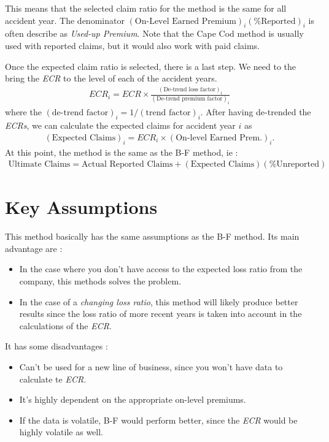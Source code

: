 \documentclass[11pt, english]{memoir}
\numberwithin{definition}{section}
\begin{document}
This means that the selected claim ratio for the method is the same for all accident year. The denominator $  (\text{On-Level Earned Premium})_{i} (\text{\% Reported})_{i} $ is often describe as \emph{Used-up Premium}. Note that the Cape Cod method is usually used with reported claims, but it would also work with paid claims. 

Once the expected claim ratio is selected, there is a last step. We need to the bring the \emph{ECR} to the level of each of the accident years. 
\begin{align*}
ECR_{i} = ECR \times \frac{(\text{De-trend loss factor})_{i}}{(\text{De-trend premium factor})_{i}}
\end{align*}
where the $ (\text{de-trend factor})_{i} = 1/(\text{trend factor})_{i}  $. After having de-trended the \emph{ECRs}, we can calculate the expected claims for accident year $ i $ as 
\begin{align*}
(\text{Expected Claims})_{i} = ECR_{i} \times (\text{On-level Earned Prem.})_{i}.
\end{align*}
At this point, the method is the same as the B-F method, ie : 
\begin{align*}
\text{Ultimate Claims} = \text{Actual Reported Claims} + (\text{Expected Claims})(\text{\% Unreported})
\end{align*}
\section{Key Assumptions}
This method basically has the same assumptions as the B-F method. 
Its main advantage are :
\begin{itemize}
	\item In the case where you don't have access to the expected loss ratio from the company, this methods solves the problem. 
	\item In the case of a \emph{changing loss ratio}, this method will likely produce better results since the loss ratio of more recent years is taken into account in the calculations of the \emph{ECR}.
\end{itemize}

It has some disadvantages : 
\begin{itemize}
	\item Can't be used for a new line of business, since you won't have data to calculate te \emph{ECR}. 
	\item It's highly dependent on the appropriate on-level premiums.
	\item If the data is volatile, B-F would perform better, since the \emph{ECR} would be highly volatile as well. 
\end{itemize}
\end{document}
